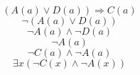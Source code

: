 \documentclass[letterpaper,10pt]{article}
\begin{document}
\begin{minipage}[c]{0.4\textwidth}
\begin{equation*}
     \end{equation*}
     \begin{equation*}
        (A(a) \vee D(a)) \Rightarrow C(a)
     \end{equation*}
     \begin{equation*}
        \neg (A(a) \vee D(a))
     \end{equation*}
     \begin{equation*}
        \neg A(a) \wedge \neg D(a)
     \end{equation*}
     \begin{equation*}
        \neg A(a)
     \end{equation*}
     \begin{equation*}
        \neg C(a) \wedge \neg A(a)
     \end{equation*}
     \begin{equation*}
        \exists x (\neg C(x) \wedge \neg A(x))
     \end{equation*}
    \end{minipage}
\end{document}
